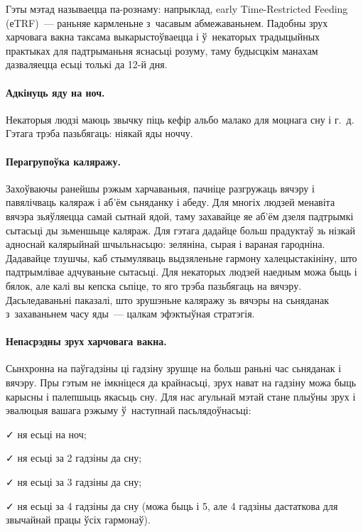 Гэты мэтад называецца па-рознаму: напрыклад, early Time-Restricted Feeding (еTRF)~--- раньняе кармленьне з~часавым абмежаваньнем. Падобны зрух харчовага вакна таксама выкарыстоўваецца і ў~некаторых традыцыйных практыках для падтрыманьня яснасьці розуму, таму будысцкім манахам дазваляецца есьці толькі да 12-й дня.

\paragraph{Адкінуць яду на ноч.}
Некаторыя людзі маюць звычку піць кефір альбо малако для моцнага сну і г.~д. Гэтага трэба пазьбягаць: ніякай яды ноччу.

\paragraph{Перагрупоўка каляражу.}
Захоўваючы ранейшы рэжым харчаваньня, пачніце разгружаць вячэру і павялічваць каляраж і аб'ём сьняданку і абеду. Для многіх людзей менавіта вячэра зьяўляецца самай сытнай ядой, таму захавайце яе аб'ём дзеля падтрымкі сытасьці ды зьменшыце каляраж. Для гэтага дадайце больш прадуктаў зь нізкай адноснай калярыйнай шчыльнасьцю: зеляніна, сырая і вараная гародніна. Дадавайце тлушчы, каб стымуляваць выдзяленьне гармону халецыстакініну, што падтрымлівае адчуваньне сытасьці. Для некаторых людзей наедным можа быць і бялок, але калі вы кепска сьпіце, то яго трэба пазьбягаць на вячэру. Дасьледаваньні паказалі, што зрушэньне каляражу зь вячэры на сьняданак з~захаваньнем часу яды~--- цалкам эфэктыўная стратэгія.

\paragraph{Непасрэдны зрух харчовага вакна.}
Сынхронна на паўгадзіны ці гадзіну зрушце на больш раньні час сьняданак і вячэру. Пры гэтым не імкніцеся да крайнасьці, зрух нават на гадзіну можа быць карысны і палепшыць якасьць сну. Для нас агульнай мэтай стане плыўны зрух і эвалюцыя вашага рэжыму ў~наступнай пасьлядоўнасьці:

✓ ня есьці на ноч;

✓ ня есьці за 2 гадзіны да сну;

✓ ня есьці за 3 гадзіны да сну;

✓ ня есьці за 4 гадзіны да сну (можа быць і 5, але 4 гадзіны дастаткова для звычайнай працы ўсіх гармонаў).

